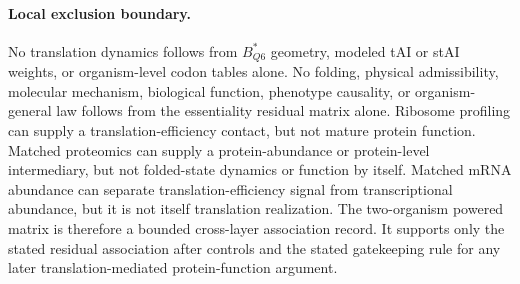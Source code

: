 \paragraph{Local exclusion boundary.}
No translation dynamics follows from $B^{*}_{Q6}$ geometry, modeled tAI or stAI weights, or organism-level codon tables alone.  No folding, physical admissibility, molecular mechanism, biological function, phenotype causality, or organism-general law follows from the essentiality residual matrix alone.  Ribosome profiling can supply a translation-efficiency contact, but not mature protein function.  Matched proteomics can supply a protein-abundance or protein-level intermediary, but not folded-state dynamics or function by itself.  Matched mRNA abundance can separate translation-efficiency signal from transcriptional abundance, but it is not itself translation realization.  The two-organism powered matrix is therefore a bounded cross-layer association record.  It supports only the stated residual association after controls and the stated gatekeeping rule for any later translation-mediated protein-function argument.
